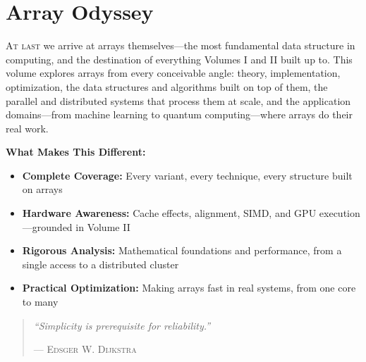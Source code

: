 %
\part{Array Odyssey}
\label{part:array-odyssey}

\begin{partintro}
\lettrine[lines=3]{A}{t last} we arrive at arrays themselves---the most fundamental data structure in computing, and the destination of everything Volumes I and II built up to. This volume explores arrays from every conceivable angle: theory, implementation, optimization, the data structures and algorithms built on top of them, the parallel and distributed systems that process them at scale, and the application domains---from machine learning to quantum computing---where arrays do their real work.

\vspace{1em}
\textbf{What Makes This Different:}
\begin{itemize}[noitemsep]
    \item \textbf{Complete Coverage:} Every variant, every technique, every structure built on arrays
    \item \textbf{Hardware Awareness:} Cache effects, alignment, SIMD, and GPU execution---grounded in Volume II
    \item \textbf{Rigorous Analysis:} Mathematical foundations and performance, from a single access to a distributed cluster
    \item \textbf{Practical Optimization:} Making arrays fast in real systems, from one core to many
\end{itemize}

\begin{quote}
\textit{``Simplicity is prerequisite for reliability.''}

\hfill--- \textsc{Edsger W. Dijkstra}
\end{quote}
\end{partintro}

